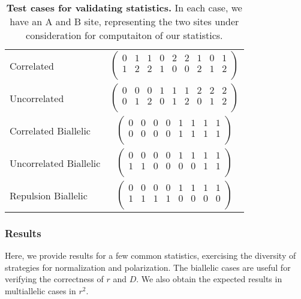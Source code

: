 \documentclass[12pt]{article}
\begin{document}
\begin{table}[H]
\begin{tabular}{lc}
    \hline
    Correlated & $\left(\begin{array}{ccccccccc}
                          0 & 1 & 1 & 0 & 2 & 2 & 1 & 0 & 1 \\
                          1 & 2 & 2 & 1 & 0 & 0 & 2 & 1 & 2 \\
                        \end{array}\right)$ \\
    Uncorrelated & $\left(\begin{array}{ccccccccc}
                            0 & 0 & 0 & 1 & 1 & 1 & 2 & 2 & 2 \\
                            0 & 1 & 2 & 0 & 1 & 2 & 0 & 1 & 2 \\
                          \end{array}\right)$ \\
    Correlated Biallelic & $\left(\begin{array}{cccccccc}
                                    0 & 0 & 0 & 0 & 1 & 1 & 1 & 1 \\
                                    0 & 0 & 0 & 0 & 1 & 1 & 1 & 1 \\
                                  \end{array}\right)$ \\
    Uncorrelated Biallelic & $\left(\begin{array}{cccccccc}
                                      0 & 0 & 0 & 0 & 1 & 1 & 1 & 1 \\
                                      1 & 1 & 0 & 0 & 0 & 0 & 1 & 1 \\
                                    \end{array}\right)$ \\
    Repulsion Biallelic & $\left(\begin{array}{cccccccc}
                                   0 & 0 & 0 & 0 & 1 & 1 & 1 & 1 \\
                                   1 & 1 & 1 & 1 & 0 & 0 & 0 & 0 \\
                                 \end{array}\right)$ \\
  \end{tabular}
  \caption{
    \textbf{Test cases for validating statistics.}
    In each case, we have an A and B site, representing the two sites under
    consideration for computaiton of our statistics.
  }
  \label{table:test_cases}
\end{table}

\subsubsection{Results}
Here, we provide results for a few common statistics, exercising the diversity
of strategies for normalization and polarization. The biallelic cases are useful
for verifying the correctness of $r$ and $D$. We also obtain the expected
results in multiallelic cases in $r^2$.
\end{document}
